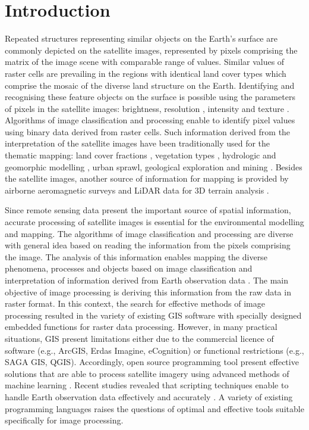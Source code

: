 \documentclass[algorithms,article,submit,pdftex,moreauthors]{Definitions/mdpi}
\begin{document}
\section{Introduction}
Repeated structures representing similar objects on the Earth's surface are commonly depicted on the satellite images, represented by pixels comprising the matrix of the image scene with comparable range of values. Similar values of raster cells are prevailing in the regions with identical land cover types which comprise the mosaic of the diverse land structure on the Earth. Identifying and recognising these feature objects on the surface is possible using the parameters of pixels in the satellite images: brightness, resolution \cite{4426419,322052,5446016}, intensity \cite{4761020,8519176} and texture \cite{995559,899813,8868688}. Algorithms of image classification and processing enable to identify pixel values using binary data derived from raster cells. Such information derived from the interpretation of the satellite images have been traditionally used for the thematic mapping: land cover fractions \cite{COULIBALY2021108092}, vegetation types \cite{7729337,Lemenkova2020d,6946534,Lemenkova202019,6352694}, hydrologic and geomorphic modelling \cite{2015hydrologie}, urban sprawl, geological exploration and mining \cite{1457509,NGOM2022102873}. Besides the satellite images, another source of information for mapping is provided by airborne aeromagnetic surveys \cite{JESSELL2015440,SIAGNE2022104680} and LiDAR data for 3D terrain analysis \cite{SHARMA2021317,8978301,9213897,YEH2017236,9553919,LI201955,GUPTA2022100817}. 

Since remote sensing data present the important source of spatial information, accurate processing of satellite images is essential for the environmental modelling and mapping. The algorithms of image classification and processing are diverse with general idea based on reading the information from the pixels comprising the image. The analysis of this information enables mapping the diverse phenomena, processes and objects based on image classification and interpretation of information derived from Earth observation data \cite{PERIN2021106694,PAHLEVAN2022112860,Lemenkova202141,ABU2021107863,ATTOUMANE2022103285}. The main objective of image processing is deriving this information from the raw data in raster format. In this context, the search for effective methods of image processing resulted in the variety of existing GIS software with specially designed embedded functions for raster data processing. However, in many practical situations, GIS present limitations either due to the commercial licence of software (e.g., ArcGIS, Erdas Imagine, eCognition) or functional restrictions (e.g., SAGA GIS, QGIS). Accordingly, open source programming tool present effective solutions that are able to process satellite imagery using advanced methods of machine learning \cite{MASOLELE2021112600,9066075,MARTINS2022113203,rs71114876}. Recent studies revealed that scripting techniques enable to handle Earth observation data effectively and accurately \cite{6344536,ELLEFSEN20191171,Lemenkova202212,6910592,Lemenkova202215,4160259}. A variety of existing programming languages raises the questions of optimal and effective tools suitable specifically for image processing. 
\end{document}
